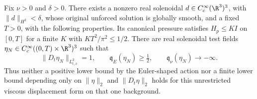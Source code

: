 \begin{theorem}
\label{va:negative}
Fix $\nu>0$ and $\delta>0$. There exists a nonzero real solenoidal
$d\in C_c^\infty(\R^3)^3$, with $\|d\|_{H^3}<\delta$, whose original
unforced solution is globally smooth, and a fixed $T>0$, with the following
properties. Its canonical pressure satisfies $H_p\le K I$ on $[0,T]$ for
a finite $K$ with $KT^2/\pi^2\le1/2$. There are real solenoidal test fields
$\eta_N\in C_c^\infty((0,T)\times\R^3)^3$ such that
\[
 \|D_t\eta_N\|_{L^2_{t,x}}=1,\qquad
 \mathfrak q_E(\eta_N)\ge\tfrac12,\qquad
 \mathfrak q_\nu(\eta_N)\longrightarrow-\infty.
\]
Thus neither a positive lower bound by the Euler-shaped action nor a finite
lower bound depending only on $\|\eta\|_2$ and $\|D_t\eta\|_2$ holds for
this unrestricted viscous displacement form on that one background.
\end{theorem}
